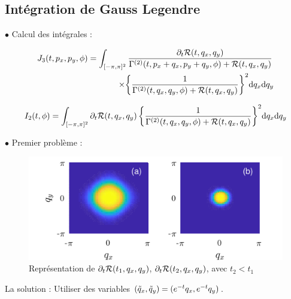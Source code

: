 \documentclass[9pt]{beamer}
\begin{document}
		
	\subsection{Intégration de Gauss Legendre}
	
	
	\begin{frame}
	\justifying
	\vspace*{22pt}
	
	$\bullet$ Calcul des intégrales : 
	{\footnotesize
	\begin{equation*}
	\begin{split}
		J_3(t, p_x, p_y,\phi)  = \int_{[-\pi,\pi]^{2}}  \frac{\partial_t \mathcal{R}(t, q_x, q_y)}{\Gamma^{(2)}(t, p_x + q_x, p_y + q_y, \phi) + \mathcal{R}(t, q_x, q_y)}\, \\ \times {\left\{ \frac{1}{\Gamma^{(2)}(t, q_x, q_y, \phi) + \mathcal{R}(t,q_x,q_y)} \right\}}^{2}  \text{d} q_x \text{d} q_y 
		\end{split}
	\end{equation*}
	
	\begin{equation*}
		I_2(t,\phi)  = \int_{[-\pi,\pi]^{2}} \partial_t \mathcal{R}(t, q_x, q_y) \, {\left\{ \frac{1}{\Gamma^{(2)}(t, q_x, q_y, \phi) + \mathcal{R}(t, q_x, q_y)} \right\}}^{2}  \text{d} q_x \text{d} q_y 
	\end{equation*}}

$\bullet$ Premier problème :

	\begin{figure}[H]
\begin{center}
\includegraphics[scale = 0.8]{DerRegIsing.pdf}
\caption{Représentation de $\partial_t \mathcal{R}(t_1, q_x, q_y)$, $\partial_t \mathcal{R}(t_2, q_x, q_y)$, avec $t_2 < t_1$}
	\label{fig:schemaIsing}
	\end{center}
\end{figure}
\vspace*{-11pt}
La solution : Utiliser des variables $(\tilde{q}_x, \tilde{q}_y) = (e^{-t}q_x, e^{-t}q_y)$.
	
	
	\end{frame}
\end{document}
